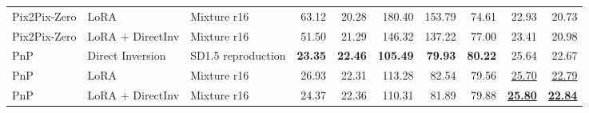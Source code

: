 \documentclass[11pt]{article}
\begin{document}
\begin{landscape}
\begin{table}[p]
{\begin{tabular}{lllrrrrrrr}
    Pix2Pix-Zero & LoRA & Mixture r16 & 63.12 & 20.28 & 180.40 & 153.79 & 74.61 & 22.93 & 20.73 \\
    Pix2Pix-Zero & LoRA + DirectInv & Mixture r16 & 51.50 & 21.29 & 146.32 & 137.22 & 77.00 & 23.41 & 20.98 \\
    \midrule
    PnP & Direct Inversion & SD1.5 reproduction & \textbf{23.35} & \textbf{22.46} & \textbf{105.49} & \textbf{79.93} & \textbf{80.22} & 25.64 & 22.67 \\
    PnP & LoRA & Mixture r16 & 26.93 & 22.31 & 113.28 & 82.54 & 79.56 & \underline{25.70} & \underline{22.79} \\
    PnP & LoRA + DirectInv & Mixture r16 & 24.37 & 22.36 & 110.31 & 81.89 & 79.88 & \underline{\textbf{25.80}} & \underline{\textbf{22.84}} \\
    \bottomrule
  \end{tabular}%
  }
\end{table}
\end{landscape}
\end{document}
